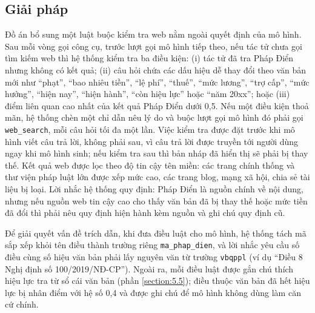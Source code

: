\documentclass[../DoAn.tex]{subfiles}
\begin{document}
\subsection{Giải pháp}
Đồ án bổ sung một luật buộc kiểm tra web nằm ngoài quyết định của mô hình. Sau mỗi vòng gọi công cụ, trước lượt gọi mô hình tiếp theo, nếu tác tử chưa gọi tìm kiếm web thì hệ thống kiểm tra ba điều kiện: (i) tác tử đã tra Pháp Điển nhưng không có kết quả; (ii) câu hỏi chứa các dấu hiệu dễ thay đổi theo văn bản mới như ``phạt'', ``bao nhiêu tiền'', ``lệ phí'', ``thuế'', ``mức lương'', ``trợ cấp'', ``mức hưởng'', ``hiện nay'', ``hiện hành'', ``còn hiệu lực'' hoặc ``năm 20xx''; hoặc (iii) điểm liên quan cao nhất của kết quả Pháp Điển dưới 0,5. Nếu một điều kiện thoả mãn, hệ thống chèn một chỉ dẫn nêu lý do và buộc lượt gọi mô hình đó phải gọi \texttt{web\_search}, mỗi câu hỏi tối đa một lần. Việc kiểm tra được đặt trước khi mô hình viết câu trả lời, không phải sau, vì câu trả lời được truyền tới người dùng ngay khi mô hình sinh; nếu kiểm tra sau thì bản nháp đã hiển thị sẽ phải bị thay thế. Kết quả web được lọc theo độ tin cậy tên miền: các trang chính thống và thư viện pháp luật lớn được xếp mức cao, các trang blog, mạng xã hội, chia sẻ tài liệu bị loại. Lời nhắc hệ thống quy định: Pháp Điển là nguồn chính về nội dung, nhưng nếu nguồn web tin cậy cao cho thấy văn bản đã bị thay thế hoặc mức tiền đã đổi thì phải nêu quy định hiện hành kèm nguồn và ghi chú quy định cũ.

Để giải quyết vấn đề trích dẫn, khi đưa điều luật cho mô hình, hệ thống tách mã sắp xếp khỏi tên điều thành trường riêng \texttt{ma\_phap\_dien}, và lời nhắc yêu cầu số điều cùng số hiệu văn bản phải lấy nguyên văn từ trường \texttt{vbqppl} (ví dụ ``Điều 8 Nghị định số 100/2019/NĐ-CP''). Ngoài ra, mỗi điều luật được gắn chú thích hiệu lực tra từ sổ cái văn bản (phần \ref{section:5.5}); điều thuộc văn bản đã hết hiệu lực bị nhân điểm với hệ số 0,4 và được ghi chú để mô hình không dùng làm căn cứ chính.
\end{document}

